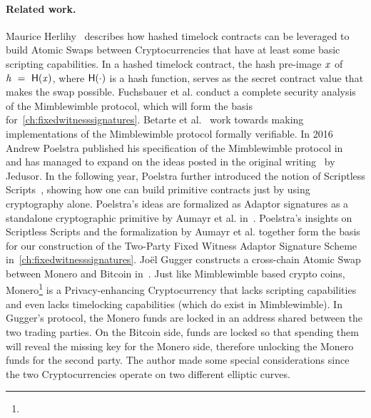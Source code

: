 \paragraph{Related work.} Maurice Herlihy~\cite{herlihy2018atomic} describes how hashed timelock contracts can be leveraged to build Atomic Swaps between Cryptocurrencies that have at least some basic scripting capabilities.
In a hashed timelock contract, the hash pre-image $\mathit{x}$ of $\mathit{h} ~=~ \mathsf{H} (\mathit{x})$, where $\mathsf{H} (\cdot)$ is a hash function, serves as the secret contract value that makes the swap possible.
Fuchsbauer et al. conduct a complete security analysis of the Mimblewimble protocol, which will form the basis for~\cref{ch:fixedwitnesssignatures}.
Betarte et al.~\cite{betarte2019towards} work towards making implementations of the Mimblewimble protocol formally verifiable.
In 2016 Andrew Poelstra published his specification of the Mimblewimble protocol in~\cite{poelstra2016mimblewimble} and has managed to expand on the ideas posted in the original writing~\cite{jedusor2016mimblewimble} by Jedusor.
In the following year, Poelstra further introduced the notion of Scriptless Scripts~\cite{poelstra2017scriptless}, showing how one can build primitive contracts just by using cryptography alone.
Poelstra's ideas are formalized as Adaptor signatures as a standalone cryptographic primitive by Aumayr et al. in~\cite{aumayr2020bitcoinchannels}.
Poelstra's insights on Scriptless Scripts and the formalization by Aumayr et al. together form the basis for our construction of the Two-Party Fixed Witness Adaptor Signature Scheme in~\cref{ch:fixedwitnesssignatures}.
Joël Gugger constructs a cross-chain Atomic Swap between Monero and Bitcoin in~\cite{gugger2020bitcoin}.
Just like Mimblewimble based crypto coins, Monero\footnote{\urlmonero} is a Privacy-enhancing Cryptocurrency that lacks scripting capabilities and even lacks timelocking capabilities (which do exist in Mimblewimble).
In Gugger's protocol, the Monero funds are locked in an address shared between the two trading parties.
On the Bitcoin side, funds are locked so that spending them will reveal the missing key for the Monero side, therefore unlocking the Monero funds for the second party.
The author made some special considerations since the two Cryptocurrencies operate on two different elliptic curves.